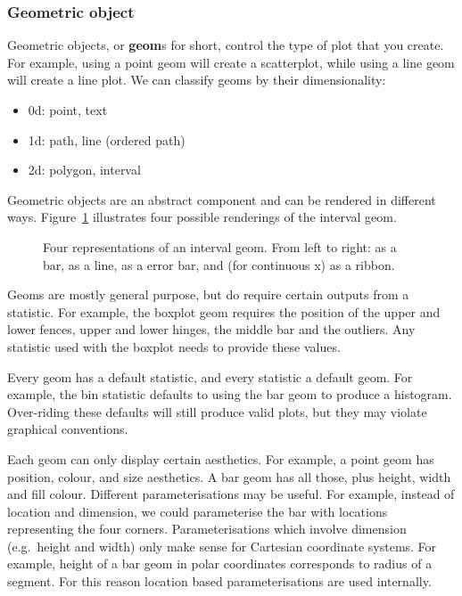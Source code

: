 \subsubsection{Geometric object}\label{sub:geometric-objects} 

Geometric objects, or {\bf geom}s for short, control the type of plot that you create.  For example, using a point geom will create a scatterplot, while using a line geom will create a line plot.  We can classify geoms by their dimensionality:

\begin{itemize}
  \item 0d: point, text
  \item 1d: path, line (ordered path)
  \item 2d: polygon, interval
\end{itemize}

Geometric objects are an abstract component and can be rendered in different ways. Figure~\ref{fig:interval} illustrates four possible renderings of the interval geom. 

\begin{figure}[htbp]
  \centering
  \caption{Four representations of an interval geom.  From left to right: as a bar, as a line, as a error bar, and (for continuous x) as a ribbon.}
  \label{fig:interval}
\end{figure}

Geoms are mostly general purpose, but do require certain outputs from a statistic.  For example, the boxplot geom requires the position of the upper and lower fences, upper and lower hinges, the middle bar and the outliers. Any statistic used with the boxplot needs to provide these values. 

Every geom has a default statistic, and every statistic a default geom.  For example, the bin statistic defaults to using the bar geom to produce a histogram.  Over-riding these defaults will still produce valid plots, but they may violate graphical conventions.

Each geom can only display certain aesthetics.  For example, a point geom has position, colour, and size aesthetics.  A bar geom has all those, plus height, width and fill colour.  Different parameterisations may be useful.  For example, instead of location and dimension, we could parameterise the bar with locations representing the four corners.  Parameterisations which involve dimension (e.g.\ height and width) only make sense for Cartesian coordinate systems.  For example, height of a bar geom in polar coordinates corresponds to radius of a segment.  For this reason location based parameterisations are used internally.  

